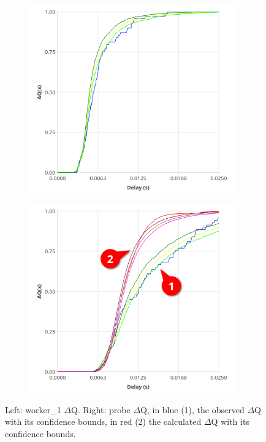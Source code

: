        \begin{figure}[H]
            \centering
            \begin{subfigure}{.5\textwidth}
                \centering
                \includegraphics[width=0.98\textwidth]{img/overload_2/250_worker.png}
                \label{fig:high_load_1}
            \end{subfigure}%
            \begin{subfigure}{.5\textwidth}
                \centering
                \includegraphics[width =0.98\textwidth]{img/overload_2/250_probe2.png}
                \label{fig:high_load_2}
            \end{subfigure}
            \label{fig:early_ov}
            \caption{Left: worker\_1 $\Delta$Q. Right: probe $\Delta$Q, in blue (1), the observed $\Delta$Q with its confidence bounds, in red (2) the calculated $\Delta$Q with its confidence bounds.}
        \end{figure}
    
